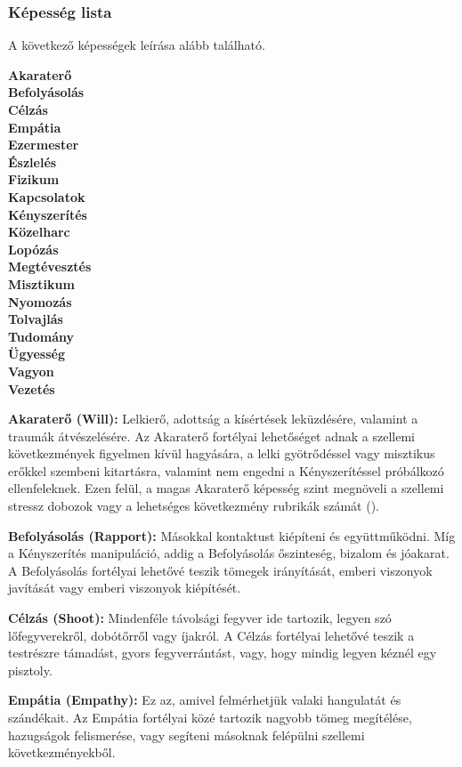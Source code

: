 \subsubsection{Képesség lista}

A következő képességek leírása alább található.

\begin{multicols}{5}
\textbf{
Akaraterő \\
Befolyásolás \\
Célzás \\
Empátia \\
Ezermester \\
Észlelés \\
Fizikum \\
Kapcsolatok \\
Kényszerítés \\
Közelharc \\
Lopózás \\
Megtévesztés \\
Misztikum \\
Nyomozás \\
Tolvajlás \\
Tudomány \\
Ügyesség \\
Vagyon \\
Vezetés
}
\end{multicols}

\textbf{Akaraterő (Will):} Lelkierő, adottság a kísértések leküzdésére, valamint a traumák átvészelésére. Az Akaraterő fortélyai lehetőséget adnak a szellemi következmények figyelmen kívül hagyására, a lelki gyötrődéssel vagy misztikus erőkkel szembeni kitartásra, valamint nem engedni a Kényszerítéssel próbálkozó ellenfeleknek. Ezen felül, a magas Akaraterő képesség szint megnöveli a szellemi stressz dobozok vagy a lehetséges következmény rubrikák számát ().

\textbf{Befolyásolás (Rapport):} Másokkal kontaktust kiépíteni és együttműködni. Míg a Kényszerítés manipuláció, addig a Befolyásolás őszinteség, bizalom és jóakarat. A Befolyásolás fortélyai lehetővé teszik tömegek irányítását, emberi viszonyok javítását vagy emberi viszonyok kiépítését.

\textbf{Célzás (Shoot):} Mindenféle távolsági fegyver ide tartozik, legyen szó lőfegyverekről, dobótőrről vagy íjakról. A Célzás fortélyai lehetővé teszik a testrészre támadást, gyors fegyverrántást, vagy, hogy mindig legyen kéznél egy pisztoly.

\textbf{Empátia (Empathy):} Ez az, amivel felmérhetjük valaki hangulatát és szándékait. Az Empátia fortélyai közé tartozik nagyobb tömeg megítélése, hazugságok felismerése, vagy segíteni másoknak felépülni szellemi következményekből.

